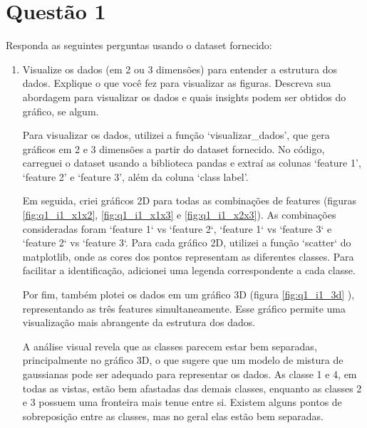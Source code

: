 \section*{Questão 1}

Responda as seguintes perguntas usando o dataset fornecido:

\begin{enumerate}

\item Visualize os dados (em 2 ou 3 dimensões) para entender a estrutura dos dados.
Explique o que você fez para visualizar as figuras. Descreva sua abordagem para visualizar os dados e quais insights podem ser obtidos do gráfico, se algum.

\begin{tcolorbox}[colback=white, colframe=black, title=Resposta:]
    Para visualizar os dados, utilizei a função `visualizar\_dados', que gera gráficos em 2 e 3 dimensões a partir do dataset fornecido. No código, carreguei o dataset usando a biblioteca pandas e extraí as colunas `feature 1', `feature 2' e `feature 3', além da coluna `class label'.
    
    Em seguida, criei gráficos 2D para todas as combinações de features (figuras \ref{fig:q1_i1_x1x2}, \ref{fig:q1_i1_x1x3} e \ref{fig:q1_i1_x2x3}). As combinações consideradas foram `feature 1` vs `feature 2`, `feature 1` vs `feature 3` e `feature 2` vs `feature 3`. Para cada gráfico 2D, utilizei a função `scatter` do matplotlib, onde as cores dos pontos representam as diferentes classes. Para facilitar a identificação, adicionei uma legenda correspondente a cada classe.
    
    Por fim, também plotei os dados em um gráfico 3D (figura \ref{fig:q1_i1_3d} ), representando as três features simultaneamente. Esse gráfico permite uma visualização mais abrangente da estrutura dos dados.
    
    A análise visual revela que as classes parecem estar bem separadas, principalmente no gráfico 3D, o que sugere que um modelo de mistura de gaussianas pode ser adequado para representar os dados. As classe 1 e 4, em todas as vistas, estão bem afastadas das demais classes, enquanto as classes 2 e 3 possuem uma fronteira mais tenue entre si. Existem alguns pontos de sobreposição entre as classes, mas no geral elas estão bem separadas.
\end{tcolorbox}


\end{enumerate}
